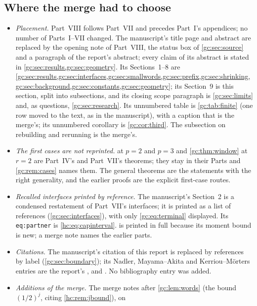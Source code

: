 \documentclass[11pt,a4paper]{article}
\theoremstyle{definition}\newaliascnt{definition}{theorem}
\theoremstyle{remark}\newaliascnt{remark}{theorem}
\begin{document}
\subsection{Where the merge had to choose}
\label{gc:sec:merge}
\begin{itemize}
\item \emph{Placement.} Part~VIII follows Part~VII and precedes Part~I's
 appendices; no number of Parts~I--VII changed. The manuscript's title page
 and abstract are replaced by the opening note of Part~VIII, the status box of
 \cref{gc:sec:source} and a paragraph of the report's abstract; every claim of
 its abstract is stated in \cref{gc:sec:results,gc:sec:geometry}. Its
 Sections~1--8 are
 \cref{gc:sec:results,gc:sec:interfaces,gc:sec:smallwords,gc:sec:prefix,gc:sec:shrinking,gc:sec:background,gc:sec:constants,gc:sec:geometry};
 its Section~9 is this section, split into subsections, and its closing scope
 paragraph is \cref{gc:sec:limits} and, as questions, \cref{gc:sec:research}.
 Its unnumbered table is \cref{gc:tab:finite} (one row moved to the text, as
 in the manuscript), with a caption that is the merge's; its unnumbered
 corollary is \cref{gc:cor:third}. The subsection on rebuilding and rerunning
 is the merge's.
\item \emph{The first cases are not reprinted.}  at $p=2$
 and $p=3$ and \cref{gc:thm:window} at $r=2$ are Part~IV's and Part~VII's
 theorems; they stay in their Parts and \cref{gc:rem:cases} names them. The
 general theorems are the statements with the right generality, and the
 earlier proofs are the explicit first-case routes.
\item \emph{Recalled interfaces printed by reference.} The manuscript's
 Section~2 is a condensed restatement of Part~VII's interfaces; it is printed
 as a list of references (\cref{gc:sec:interfaces}), with only
 \eqref{gc:eq:terminal} displayed. Its \texttt{eq:partner} is
 \eqref{hc:eq:capinterval}.  is printed in full because
 its moment bound is new; a merge note names the earlier parts.
\item \emph{Citations.} The manuscript's citation of this report is replaced
 by references by label (\cref{gc:sec:boundary}); its Nadler, Mayama--Akita
 and Kerriou--M\"orters entries are the report's \cite{Nadler},
 \cite{MayamaAkita} and \cite{pr:KerriouMorters}. No bibliography entry was
 added.
\item \emph{Additions of the merge.} The merge notes after
 \cref{gc:lem:words} (the bound $(1/2)^j$, citing \cref{hc:rem:jbound}), on

\end{itemize}
\end{document}
